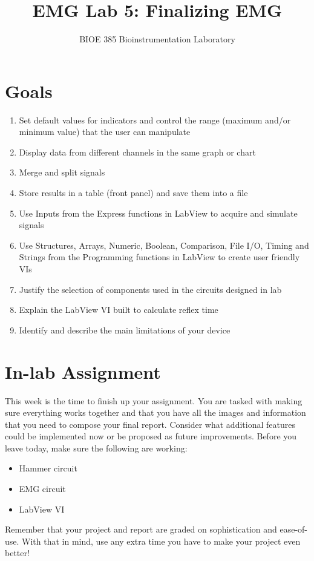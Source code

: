 \documentclass{article}
\title{EMG Lab 5: Finalizing EMG}
\author{BIOE 385 Bioinstrumentation Laboratory}
\date{}
\begin{document}
\large
\maketitle

\section*{Goals}
\begin{enumerate}
	\item Set default values for indicators and control the range (maximum and/or minimum value) that the user can manipulate
	\item Display data from different channels in the same graph or chart
	\item Merge and split signals
	\item Store results in a table (front panel) and save them into a file
	\item Use Inputs from the Express functions in LabView to acquire and simulate signals
	\item Use Structures, Arrays, Numeric, Boolean, Comparison, File I/O, Timing and Strings from the Programming functions in LabView to create user friendly VIs
	\item Justify the selection of components used in the circuits designed in lab
	\item Explain the LabView VI built to calculate reflex time
	\item Identify and describe the main limitations of your device
\end{enumerate}

\section*{In-lab Assignment}
This week is the time to finish up your assignment. You are tasked with making sure everything works together and that you have all the images and information that you need to compose your final report. Consider what additional features could be implemented now or be proposed as future improvements. Before you leave today, make sure the following are working:

\begin{itemize}
	\item Hammer circuit
	\item EMG circuit
	\item LabView VI
\end{itemize}

Remember that your project and report are graded on sophistication and ease-of-use. With that in mind, use any extra time you have to make your project even better!
\end{document}
